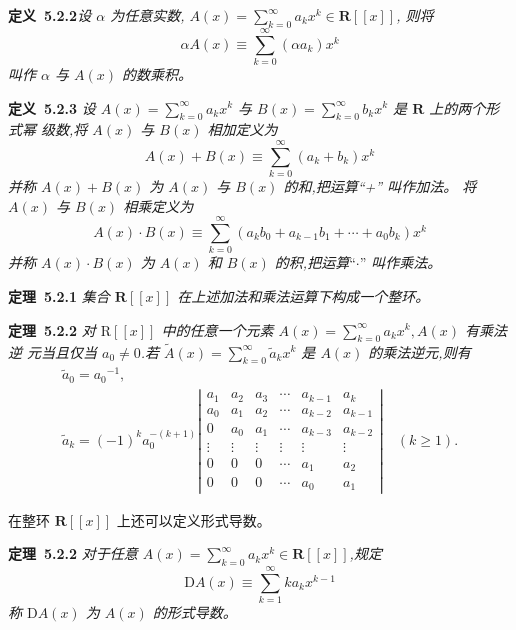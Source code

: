 \documentclass{report}
\begin{document}
\noindent
\textbf{定义\ 5.2.2}\textsl {设 $\alpha$ 为任意实数, $A(x)=\sum_{k=0}^{\infty} a_{k} x^{k} \in \mathbf{R}[[x]]$, 则将
$$
\alpha A(x) \equiv \sum_{k=0}^{\infty}\left(\alpha a_{k}\right) x^{k}
$$
叫作 $\alpha$ 与 $A(x)$ 的数乘积。}

\noindent
\textbf{定义\ 5.2.3}\textsl{ 设 $A(x)=\sum_{k=0}^{\infty} a_{k} x^{k}$ 与 $B(x)=\sum_{k=0}^{\infty} b_{k} x^{k}$ 是 $\mathbf{R}$ 上的两个形式幂 级数,将 $A(x)$ 与 $B(x)$ 相加定义为
$$
A(x)+B(x) \equiv \sum_{k=0}^{\infty}\left(a_{k}+b_{k}\right) x^{k}
$$
并称 $A(x)+B(x)$ 为 $A(x)$ 与 $B(x)$ 的和,把运算“+” 叫作加法。
将 $A(x)$ 与 $B(x)$ 相乘定义为
$$
A(x) \cdot B(x) \equiv \sum_{k=0}^{\infty}\left(a_{k} b_{0}+a_{k-1} b_{1}+\cdots+a_{0} b_{k}\right) x^{k}
$$
并称 $A(x) \cdot B(x)$ 为 $A(x)$ 和 $B(x)$ 的积,把运算$“\cdot”$ 叫作乘法。}


\noindent
\textbf{定理\ 5.2.1} \textsl{集合 $\mathbf{R}[[x]]$ 在上述加法和乘法运算下构成一个整环。}

\noindent
\textbf{定理\ 5.2.2} \textsl{对 $\mathrm{R}[[x]]$ 中的任意一个元素 $A(x)=\sum_{k=0}^{\infty} a_{k} x^{k}, A(x)$ 有乘法逆 元当且仅当 $a_{0} \neq 0$.若 $\widetilde{A}(x)=\sum_{k=0}^{\infty} \tilde{a}_{k} x^{k}$ 是 $A(x)$ 的乘法逆元,则有
$$
\begin{array}{l}
\tilde{a}_{0}=a_{0}{ }^{-1}, \\
\tilde{a}_{k}=(-1)^{k} a_{0}^{-(k+1)}\left|\begin{array}{cccccc}
a_{1} & a_{2} & a_{3} & \cdots & a_{k-1} & a_{k} \\
a_{0} & a_{1} & a_{2} & \cdots & a_{k-2} & a_{k-1} \\
0 & a_{0} & a_{1} & \cdots & a_{k-3} & a_{k-2} \\
\vdots & \vdots & \vdots & \vdots & \vdots & \vdots \\
0 & 0 & 0 & \cdots & a_{1} & a_{2} \\
0 & 0 & 0 & \cdots & a_{0} & a_{1}
\end{array}\right| \quad(k \geqslant 1) .
\end{array}
$$ }

在整环 $\mathbf{R}[[x]]$ 上还可以定义形式导数。

\noindent
\textbf{定理\ 5.2.2} \textsl{对于任意 $A(x)=\sum_{k=0}^{\infty} a_{k} x^{k} \in \mathbf{R}[[x]]$,规定$$
\mathrm{D} A(x) \equiv \sum_{k=1}^{\infty} k a_{k} x^{k-1}
$$
称 $\mathrm{D} A(x)$ 为 $A(x)$ 的形式导数。 }
\end{document}
